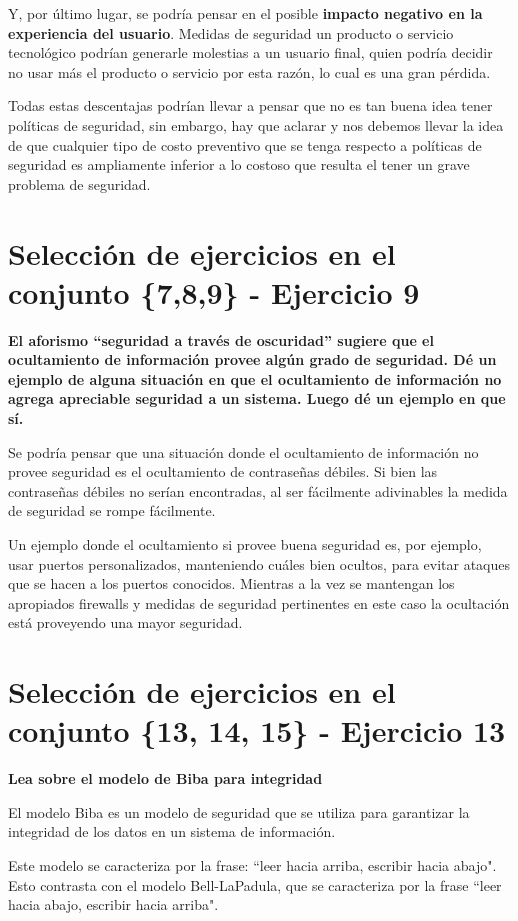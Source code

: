 \documentclass[11pt]{article}
\begin{document}
Y, por último lugar, se podría pensar en el posible \textbf{impacto negativo en la experiencia del usuario}. Medidas de seguridad un producto o servicio tecnológico podrían generarle molestias a un usuario final, quien podría decidir no usar más el producto o servicio por esta razón, lo cual es una gran pérdida.

Todas estas descentajas podrían llevar a pensar que no es tan buena idea tener políticas de seguridad, sin embargo, hay que aclarar y nos debemos llevar la idea de que cualquier tipo de costo preventivo que se tenga respecto a políticas de seguridad es ampliamente inferior a lo costoso que resulta el tener un grave problema de seguridad.

\section*{Selección de ejercicios en el conjunto \{7,8,9\} - Ejercicio 9}

\textbf{El aforismo “seguridad a través de oscuridad” sugiere que el ocultamiento de información provee
algún grado de seguridad. Dé un ejemplo de alguna situación en que el ocultamiento de información
no agrega apreciable seguridad a un sistema. Luego dé un ejemplo en que sí.}

Se podría pensar que una situación donde el ocultamiento de información no provee seguridad es el ocultamiento de contraseñas débiles. Si bien las contraseñas débiles no serían encontradas, al ser fácilmente adivinables la medida de seguridad se rompe fácilmente.

Un ejemplo donde el ocultamiento si provee buena seguridad es, por ejemplo, usar puertos personalizados, manteniendo cuáles bien ocultos, para evitar ataques que se hacen a los puertos conocidos. Mientras a la vez se mantengan los apropiados firewalls y medidas de seguridad pertinentes en este caso la ocultación está proveyendo una mayor seguridad. 

\section*{Selección de ejercicios en el conjunto \{13, 14, 15\} - Ejercicio 13}

\textbf{Lea sobre el modelo de Biba para integridad}

El modelo Biba es un modelo de seguridad que se utiliza para garantizar la integridad de los datos en un sistema de información. 

Este modelo se caracteriza por la frase: ``leer hacia arriba, escribir hacia abajo". Esto contrasta con el modelo Bell-LaPadula, que se caracteriza por la frase ``leer hacia abajo, escribir hacia arriba".
\end{document}
